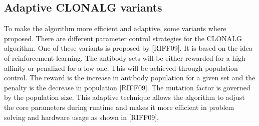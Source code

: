 \subsection{Adaptive CLONALG variants}
To make the algorithm more efficient and adaptive, some variants where proposed. There are different parameter control strategies for the CLONALG algorithm. One of these variants is proposed by [RIFF09]. It is based on the idea of reinforcement learning. The antibody sets will be either rewarded for a high affinity or penalized for a low one. This will be achieved through population control. The reward is the increase in antibody population for a given set and the penalty is the decrease in population [RIFF09]. The mutation factor is governed by the population size. This adaptive technique allows the algorithm to adjust the core parameters during runtime and makes it more efficient in problem solving and hardware usage as shown in [RIFF09].
 




